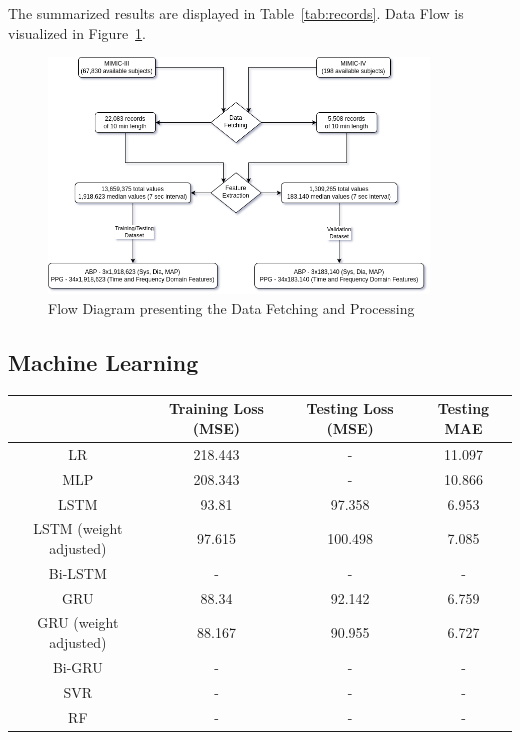 The summarized results are displayed in Table~\ref{tab:records}.
Data Flow is visualized in Figure~\ref{fig:data_flow}.

\begin{figure}[h]
    \centering
    \includegraphics[width=0.9\textwidth]{images/results/flow_diagram}
    \caption{Flow Diagram presenting the Data Fetching and Processing}
    \label{fig:data_flow}
\end{figure}

\subsection{Machine Learning}
\label{subsec:machine_learning}

\begin{center}
    \begin{tabular}{ |c|c|c|c| }
        \hline
        & Training Loss (MSE) & Testing Loss (MSE) & Testing MAE \\
        \hline
        LR                     & 218.443             & -                  & 11.097      \\
        \hline
        MLP                    & 208.343             & -                  & 10.866      \\
        \hline
        LSTM                   & 93.81               & 97.358             & 6.953       \\
        \hline
        LSTM (weight adjusted) & 97.615              & 100.498            & 7.085       \\
        \hline
        Bi-LSTM                & -                   & -                  & -           \\
        \hline
        GRU                    & 88.34               & 92.142             & 6.759       \\
        \hline
        GRU (weight adjusted)  & 88.167              & 90.955             & 6.727       \\
        \hline
        Bi-GRU                 & -                   & -                  & -           \\
        \hline
        SVR                    & -                   & -                  & -           \\
        \hline
        RF                     & -                   & -                  & -           \\
        \hline
    \end{tabular}
\end{center}

